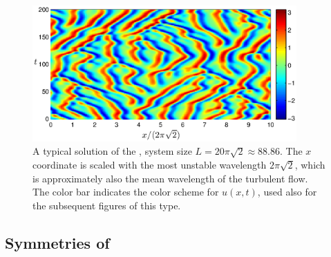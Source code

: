 \begin{figure}[t]
\begin{center}
\includegraphics[width=0.9\textwidth]{figs/ks_largeL_cbar_200.eps} %
\end{center}
\caption{
A typical  solution of the \KSe, system size
$L=20\pi\sqrt{2}\approx 88.86$.  The $x$ coordinate is scaled
with the most unstable wavelength $2\pi\sqrt{2}$, which is
approximately also the mean wavelength of the turbulent flow.
The color bar indicates the color scheme for $u(x,t)$, used also
for the subsequent figures of this type.
     } \label{f:ks_largeL}
\end{figure}

\subsection{Symmetries of \KSe}
\label{sec:KSeSymm}

